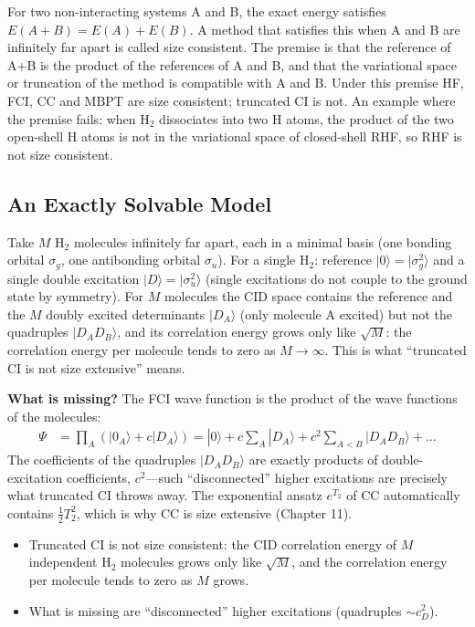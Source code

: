 For two non-interacting systems A and B, the exact energy satisfies $E(A + B) = E(A) + E(B)$. A method that satisfies this when A and B are infinitely far apart is called size consistent. The premise is that the reference of A+B is the product of the references of A and B, and that the variational space or truncation of the method is compatible with A and B. Under this premise HF, FCI, CC and MBPT are size consistent; truncated CI is not. An example where the premise fails: when H$_2$ dissociates into two H atoms, the product of the two open-shell H atoms is not in the variational space of closed-shell RHF, so RHF is not size consistent.

\subsection{An Exactly Solvable Model}

Take $M$ H$_2$ molecules infinitely far apart, each in a minimal basis (one bonding orbital $\sigma_g$, one antibonding orbital $\sigma_u$). For a single H$_2$: reference $|0\rangle = |\sigma_g^2\rangle$ and a single double excitation $|D\rangle = |\sigma_u^2\rangle$ (single excitations do not couple to the ground state by symmetry). For $M$ molecules the CID space contains the reference and the $M$ doubly excited determinants $|D_A\rangle$ (only molecule A excited) but not the quadruples $|D_A D_B\rangle$, and its correlation energy grows only like $\sqrt{M}$: the correlation energy per molecule tends to zero as $M \rightarrow \infty$. This is what ``truncated CI is not size extensive'' means.

\textbf{What is missing?} The FCI wave function is the product of the wave functions of the molecules:
\begin{align*}
\Psi &= \prod_A (|0_A\rangle + c |D_A\rangle) = |0\rangle + c \sum_A |D_A\rangle + c^2 \sum_{A<B} |D_A D_B\rangle + \dots
\end{align*}
The coefficients of the quadruples $|D_A D_B\rangle$ are exactly products of double-excitation coefficients, $c^2$---such ``disconnected'' higher excitations are precisely what truncated CI throws away. The exponential ansatz $e^{T_2}$ of CC automatically contains $\frac{1}{2} T_2^2$, which is why CC is size extensive (Chapter 11).

\begin{summary}
\begin{itemize}
\item Truncated CI is not size consistent: the CID correlation energy of $M$ independent H$_2$ molecules grows only like $\sqrt{M}$, and the correlation energy per molecule tends to zero as $M$ grows.
\item What is missing are ``disconnected'' higher excitations (quadruples $\sim c_D^2$).
\end{itemize}
\end{summary}
